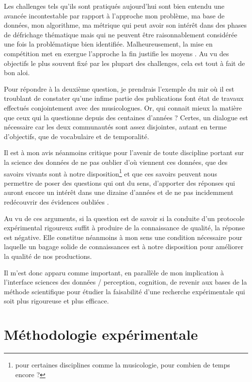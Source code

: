 Les challenges tels qu'ils sont pratiqués aujourd'hui sont bien entendu une avancée incontestable par rapport à l'approche \fg mon problème, ma base de données, mon algorithme, ma métrique \og qui peut avoir son intérêt dans des phases de défrichage thématique mais qui ne peuvent être raisonnablement considérée une fois la problématique bien identifiée. Malheureusement, la mise en compétition met en exergue l'approche \og la fin justifie les moyens \fg. Au vu des objectifs le plus souvent fixé par les plupart des challenges, cela est tout à fait de bon aloi.

Pour répondre à la deuxième question, je prendrais l'exemple du mir où il est troublant de constater qu'une infime partie des publications font état de travaux effectués conjointement avec des musicologues. Or, qui connait mieux la matière que ceux qui la questionne depuis des centaines d'années ? Certes, un dialogue est nécessaire car les deux communautés sont assez disjointes, autant en terme d'objectifs, que de vocabulaire et de temporalité.

Il est à mon avis néanmoins critique pour l'avenir de toute discipline portant sur la science des données de ne pas oublier d'où viennent ces données, que des savoirs vivants sont à notre disposition\footnote{pour certaines disciplines comme la musicologie, pour combien de temps encore ?} et que ces savoirs peuvent nous permettre de poser des questions qui ont du sens, d'apporter des réponses qui auront encore un intérêt dans une dizaine d'années et de ne pas incidemment redécouvrir des évidences \og oubliées \fg.

Au vu de ces arguments, si la question est de savoir si la conduite d'un protocole expérimental rigoureux suffit à produire de la connaissance de qualité, la réponse est négative. Elle constitue néanmoins à mon sens une condition nécessaire pour laquelle un bagage solide de connaissances est à notre disposition pour améliorer la qualité de nos productions.

Il m'est donc apparu comme important, en parallèle de mon implication à l'interface sciences des données / perception, cognition, de revenir aux bases de la méthode scientifique pour étudier la faisabilité d'une recherche expérimentale qui soit plus rigoureuse et plus efficace.

\section{ \nmu Méthodologie expérimentale} \label{sec:xp}

